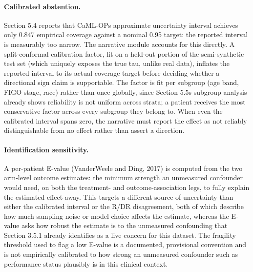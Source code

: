 \paragraph{Calibrated abstention.} Section 5.4 reports that CaML-OP\textquotesingle s approximate uncertainty interval achieves only 0.847 empirical coverage against a nominal 0.95 target: the reported interval is measurably too narrow. The narrative module accounts for this directly. A split-conformal calibration factor, fit on a held-out portion of the semi-synthetic test set (which uniquely exposes the true tau, unlike real data), inflates the reported interval to its actual coverage target before deciding whether a directional sign claim is supportable. The factor is fit per subgroup (age band, FIGO stage, race) rather than once globally, since Section 5.5\textquotesingle s subgroup analysis already shows reliability is not uniform across strata; a patient receives the most conservative factor across every subgroup they belong to. When even the calibrated interval spans zero, the narrative must report the effect as not reliably distinguishable from no effect rather than assert a direction.

\paragraph{Identification sensitivity.} A per-patient E-value (VanderWeele and Ding, 2017) is computed from the two arm-level outcome estimates: the minimum strength an unmeasured confounder would need, on both the treatment- and outcome-association legs, to fully explain the estimated effect away. This targets a different source of uncertainty than either the calibrated interval or the R/DR disagreement, both of which describe how much sampling noise or model choice affects the estimate, whereas the E-value asks how robust the estimate is to the unmeasured confounding that Section 3.5.1 already identifies as a live concern for this dataset. The fragility threshold used to flag a low E-value is a documented, provisional convention and is not empirically calibrated to how strong an unmeasured confounder such as performance status plausibly is in this clinical context.

